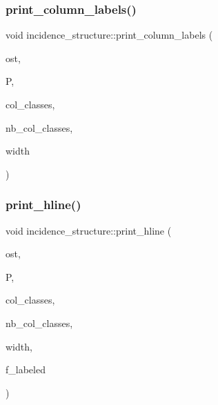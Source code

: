 \subsubsection{\texorpdfstring{print\+\_\+column\+\_\+labels()}{print\_column\_labels()}}
{\footnotesize\ttfamily void incidence\+\_\+structure\+::print\+\_\+column\+\_\+labels (\begin{DoxyParamCaption}\item[{ostream \&}]{ost,  }\item[{\mbox{\hyperlink{classpartitionstack}{partitionstack}} \&}]{P,  }\item[{\mbox{\hyperlink{galois_8h_a09fddde158a3a20bd2dcadb609de11dc}{I\+NT}} $\ast$}]{col\+\_\+classes,  }\item[{\mbox{\hyperlink{galois_8h_a09fddde158a3a20bd2dcadb609de11dc}{I\+NT}}}]{nb\+\_\+col\+\_\+classes,  }\item[{\mbox{\hyperlink{galois_8h_a09fddde158a3a20bd2dcadb609de11dc}{I\+NT}}}]{width }\end{DoxyParamCaption})}

\mbox{\label{classincidence__structure_ab973a717586b3a740a087b9c036a6b6e}} 
\subsubsection{\texorpdfstring{print\+\_\+hline()}{print\_hline()}}
{\footnotesize\ttfamily void incidence\+\_\+structure\+::print\+\_\+hline (\begin{DoxyParamCaption}\item[{ostream \&}]{ost,  }\item[{\mbox{\hyperlink{classpartitionstack}{partitionstack}} \&}]{P,  }\item[{\mbox{\hyperlink{galois_8h_a09fddde158a3a20bd2dcadb609de11dc}{I\+NT}} $\ast$}]{col\+\_\+classes,  }\item[{\mbox{\hyperlink{galois_8h_a09fddde158a3a20bd2dcadb609de11dc}{I\+NT}}}]{nb\+\_\+col\+\_\+classes,  }\item[{\mbox{\hyperlink{galois_8h_a09fddde158a3a20bd2dcadb609de11dc}{I\+NT}}}]{width,  }\item[{\mbox{\hyperlink{galois_8h_a09fddde158a3a20bd2dcadb609de11dc}{I\+NT}}}]{f\+\_\+labeled }\end{DoxyParamCaption})}

